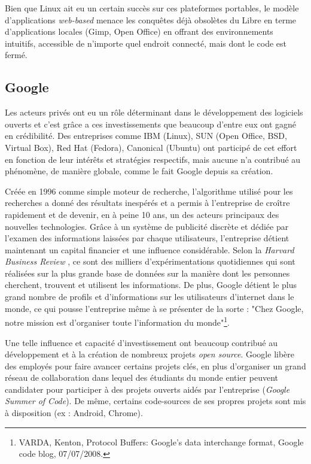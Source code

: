 Bien que Linux ait eu un certain succès sur ces plateformes portables, le modèle d'applications \emph{web-based} menace les conquêtes déjà obsolètes du Libre en terme d'applications locales (Gimp, Open Office) en offrant des environnements intuitifs, accessible de n'importe quel endroit connecté, mais dont le code est fermé.

\subsection{Google} \label{1.4.3}

Les acteurs privés ont eu un rôle déterminant dans le développement des logiciels ouverts et c'est grâce a ces investissements que beaucoup d'entre eux ont gagné en crédibilité. Des entreprises comme IBM (Linux), SUN (Open Office, BSD, Virtual Box), Red Hat (Fedora), Canonical (Ubuntu) ont participé de cet effort en fonction de leur intérêts et stratégies respectifs, mais aucune n'a contribué au phénomène, de manière globale, comme le fait Google depuis sa création.

Créée en 1996 comme simple moteur de recherche, l'algorithme utilisé pour les recherches a donné des résultats inespérés et a permis à l'entreprise de croître rapidement et de devenir, en à peine 10 ans, un des acteurs principaux des nouvelles technologies. Grâce à un système de publicité discrète et dédiée par l'examen des informations laissées par chaque utilisateurs, l'entreprise détient maintenant un capital financier et une influence considérable. Selon la \emph{Harvard Business Review} \citep{Iven+Davenport2008}, ce sont des milliers d'expérimentations quotidiennes qui sont réalisées sur la plus grande base de données sur la manière dont les personnes cherchent, trouvent et utilisent les informations. De plus, Google détient le plus grand nombre de profils et d'informations sur les utilisateurs d'internet dans le monde, ce qui pousse l'entreprise même à se présenter de la sorte : "Chez Google, notre mission est d'organiser toute l'information du monde"\footnote{VARDA, Kenton, Protocol Buffers: Google’s data interchange format, Google code blog, 07/07/2008.}.

Une telle influence et capacité d'investissement ont beaucoup contribué au développement et à la création de nombreux projets \emph{open source}. Google libère des employés pour faire avancer certains projets clés, en plus d'organiser un grand réseau de collaboration dans lequel des étudiants du monde entier peuvent candidater pour participer à des projets ouverts aidés par l'entreprise (\emph{Google Summer of Code}). De même, certains code-sources de ses propres projets sont mis à disposition (ex : Android, Chrome).

